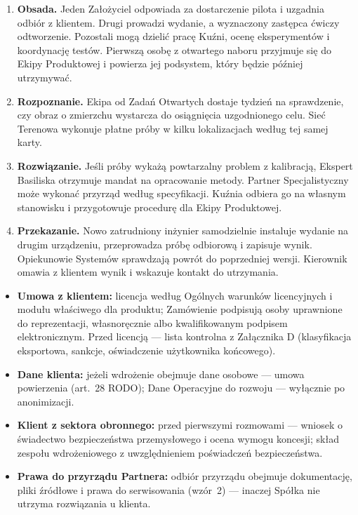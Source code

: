\documentclass[11pt,a4paper]{report}
\begin{document}
\begin{enumerate}
  \item \textbf{Obsada.} Jeden Założyciel odpowiada za dostarczenie pilota i uzgadnia odbiór z klientem. Drugi prowadzi wydanie, a wyznaczony zastępca ćwiczy odtworzenie. Pozostali mogą dzielić pracę Kuźni, ocenę eksperymentów i koordynację testów. Pierwszą osobę z otwartego naboru przyjmuje się do Ekipy Produktowej i powierza jej podsystem, który będzie później utrzymywać.
  \item \textbf{Rozpoznanie.} Ekipa od Zadań Otwartych dostaje tydzień na sprawdzenie, czy obraz o zmierzchu wystarcza do osiągnięcia uzgodnionego celu. Sieć Terenowa wykonuje płatne próby w kilku lokalizacjach według tej samej karty.
  \item \textbf{Rozwiązanie.} Jeśli próby wykażą powtarzalny problem z kalibracją, Ekspert Basiliska otrzymuje mandat na opracowanie metody. Partner Specjalistyczny może wykonać przyrząd według specyfikacji. Kuźnia odbiera go na własnym stanowisku i przygotowuje procedurę dla Ekipy Produktowej.
  \item \textbf{Przekazanie.} Nowo zatrudniony inżynier samodzielnie instaluje wydanie na drugim urządzeniu, przeprowadza próbę odbiorową i zapisuje wynik. Opiekunowie Systemów sprawdzają powrót do poprzedniej wersji. Kierownik omawia z klientem wynik i wskazuje kontakt do utrzymania.
\end{enumerate}

\begin{Prawo}
\begin{itemize}
  \item \textbf{Umowa z klientem:} licencja według Ogólnych warunków licencyjnych i modułu właściwego dla produktu; Zamówienie podpisują osoby uprawnione do reprezentacji, własnoręcznie albo kwalifikowanym podpisem elektronicznym. Przed licencją --- lista kontrolna z Załącznika D (klasyfikacja eksportowa, sankcje, oświadczenie użytkownika końcowego).
  \item \textbf{Dane klienta:} jeżeli wdrożenie obejmuje dane osobowe --- umowa powierzenia (art.~28 RODO); Dane Operacyjne do rozwoju --- wyłącznie po anonimizacji.
  \item \textbf{Klient z sektora obronnego:} przed pierwszymi rozmowami --- wniosek o świadectwo bezpieczeństwa przemysłowego i ocena wymogu koncesji; skład zespołu wdrożeniowego z uwzględnieniem poświadczeń bezpieczeństwa.
  \item \textbf{Prawa do przyrządu Partnera:} odbiór przyrządu obejmuje dokumentację, pliki źródłowe i prawa do serwisowania (wzór~2) --- inaczej Spółka nie utrzyma rozwiązania u klienta.
\end{itemize}
\end{Prawo}
\end{document}
